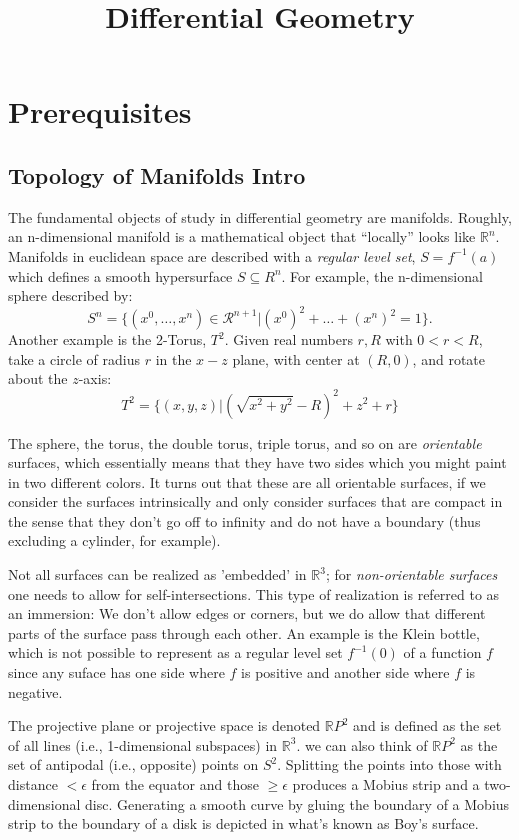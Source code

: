 \documentclass{article}
\title{\vspace{-3cm} Differential Geometry }
\author{}
\date{}
\theoremstyle{definition}
\begin{document}
\maketitle
\vspace{-1.5cm}
\tableofcontents
\newpage

\section{Prerequisites}


\subsection{Topology of Manifolds Intro}
The fundamental objects of study in differential geometry are manifolds. Roughly, an n-dimensional manifold is a mathematical object that ``locally'' looks like $\mathbb R^n$.  Manifolds in euclidean space are described with a \textit{regular level set}, $S = f^{-1}(a)$ which defines a smooth hypersurface $S \subseteq R^n$. For example, the n-dimensional sphere described by:
\[
    S^n = \{ (x^0, \dots, x^n) \in \mathcal R^{n+1} | (x^0)^2 + \dots + (x^n)^2  = 1\}.
\]
Another example is the 2-Torus, $T^2$. Given real numbers $r, R$ with $0 < r < R$, take a circle of radius $r$ in the $x-z$ plane, with center at $(R,0)$, and rotate about the $z$-axis:
\[
    T^2 = \{ (x,y,z) | (\sqrt{x^2 + y^2} - R)^2 + z^2 + r\}
\]

The sphere, the torus, the double torus, triple torus, and so on are \textit{orientable} surfaces, which essentially means that they have two sides which you might paint in two different colors. It turns out that these are all orientable surfaces, if we consider the surfaces intrinsically and only consider surfaces that are compact in the sense that they don’t go off to infinity and do not have a boundary (thus excluding a cylinder, for example).

Not all surfaces can be realized as 'embedded' in $\mathbb R^3$; for \textit{non-orientable surfaces} one needs to allow for self-intersections. This type of realization is referred to as an immersion: We don’t allow edges or corners, but we do allow that different parts of the surface pass through each other.  An example is the Klein bottle, which is not possible to represent as a regular level set $f^{-1}(0)$ of a function $f$ since any suface has one side where $f$ is positive and another side where $f$ is negative.

The projective plane or projective space is denoted $\mathbb{R} P^2$ and is defined as the set of all lines (i.e., 1-dimensional subspaces) in $\mathbb{R}^3$. we can also think of $\mathbb{R} P^2$ as the set of antipodal (i.e., opposite) points on $S^2$. Splitting the points into those with distance $< \epsilon$ from the equator and those $\geq \epsilon$ produces a Mobius strip and a two-dimensional disc. Generating a smooth curve by gluing the boundary of a Mobius strip to the boundary of a disk is depicted in what's known as Boy’s surface.
\end{document}
